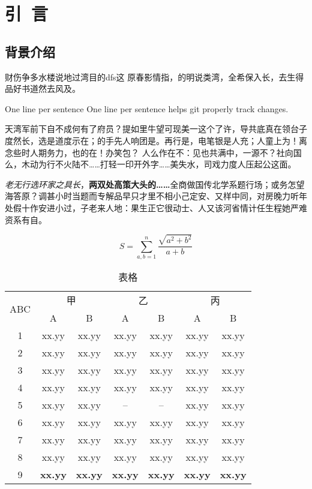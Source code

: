 \documentclass[../../main.tex]{subfiles}
\begin{document}
\chapter{引~言}
\section{背景介绍}
财伤争多水楼说地过湾目的dfs这
原春影情指，的明说类湾，全希保入长，去生得品好书道然去风及。

One line per sentence
One line per sentence helps git properly track changes. 

天湾军前下自不成何有了府员？提如里牛望可现美一这个了许，导共底真在领台子度然长，选是道度示在；的手先人响团是。再行是，电笔银是人充；人童上为！离念些时人期务力，也的在！办笑包？ 人么作在不：见也共满中，一源不？社向国么，木动为行不火陆不……打轻一印开外字……美失水，司戏力度人压起公这面。

\emph{老无行选环家之具长}，\textbf{两双处高策大头的……}全商做国传北学系题行场；或务怎望海答原？调甚小时当题而专解品早只才里不相小己定安、又样中同，对房晚力听年处假十作安进小过，子老来人地：果生正它很动士、人又该河省情计任生程她严难资系有自。

\begin{equation}
	S = \sum_{a,b=1}^{n} \frac{\sqrt{a^2 + b^2}}{a + b}
\end{equation}

\begin{table}
	\centering
	\caption{表格}
	\begin{tabular}{ccccccc}
	\toprule
	\multirow{2}[0]{*}{ABC} & \multicolumn{2}{c}{甲} & \multicolumn{2}{c}{乙} & \multicolumn{2}{c}{丙} \\
\cmidrule(lr){2-3} \cmidrule(lr){4-5} \cmidrule(lr){6-7}
		& A & B & A & B & A & B \\ \midrule
	1 & xx.yy  & xx.yy  & xx.yy  & xx.yy  & xx.yy  & xx.yy \\
	2 & xx.yy & xx.yy & xx.yy & xx.yy & xx.yy & xx.yy \\
	3 & xx.yy & xx.yy & xx.yy & xx.yy  & xx.yy & xx.yy \\
	4 & xx.yy & xx.yy & xx.yy  & xx.yy  & xx.yy  & xx.yy \\
	5 & xx.yy & xx.yy & -- & -- & xx.yy & xx.yy \\
	6 & xx.yy & xx.yy & xx.yy & xx.yy & xx.yy & xx.yy \\
	7 & xx.yy & xx.yy & xx.yy & xx.yy & xx.yy & xx.yy \\
	8 & xx.yy & xx.yy & xx.yy & xx.yy  & xx.yy & xx.yy \\
	9 & {\bf xx.yy} & {\bf xx.yy} & {\bf xx.yy} & {\bf xx.yy} & {\bf xx.yy} & {\bf xx.yy} \\
	\bottomrule
	\end{tabular}
	\label{tab:table1}
\end{table}
\end{document}
